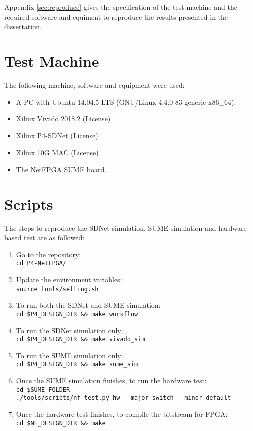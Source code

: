 Appendix \ref{sec:reproduce} gives the specification of the test machine and the required software and equiment to reproduce the results presented in the dissertation.
\section{Test Machine}
The following machine, software and equipment were used:
\begin{itemize}[leftmargin=*, noitemsep]
	\item A PC with Ubuntu 14.04.5 LTS (GNU/Linux 4.4.0-83-generic x86\_64).
	\item Xilinx Vivado 2018.2 (License)
	\item Xilinx P4-SDNet (License)
	\item Xilinx 10G MAC (License)
	\item The NetFPGA SUME board.
\end{itemize}
\section{Scripts}
The steps to reproduce the SDNet simulation, SUME simulation and hardware-based test are as followed:
\begin{enumerate}[leftmargin=*, noitemsep]
	\item Go to the repository:\\
{\centering	\verb|cd P4-NetFPGA/|}
	\item Update the environment variables:\\
	 \verb|source tools/setting.sh|
	\item To run both the SDNet and SUME simulation:\\
	 \verb|cd $P4_DESIGN_DIR && make workflow|
	\item To run the SDNet simulation only:\\
	 \verb|cd $P4_DESIGN_DIR && make vivado_sim|
	\item To run the SUME simulation only:\\
	 \verb|cd $P4_DESIGN_DIR && make sume_sim|
	\item Once the SUME simulation finishes, to run the hardware test:\\
	 \verb|cd $SUME_FOLDER| \\
	 \verb|./tools/scripts/nf_test.py hw --major switch --minor default|
	\item Once the hardware test finishes, to compile the bitstream for FPGA:\\
	 \verb|cd $NF_DESIGN_DIR && make|
\end{enumerate}